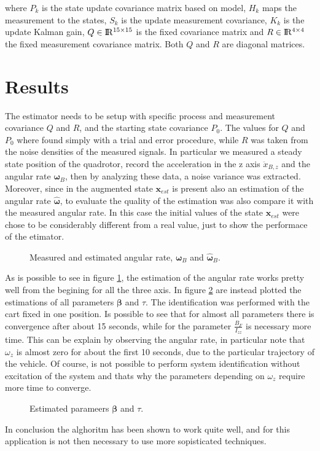 \noindent where $P_k$ is the state update covariance matrix based on model, $H_k$ maps the measurement to the states, $S_k$ is the update measurement covariance, $K_k$ is the update Kalman gain, $Q\in\rm I\!R^{15\times 15}$ is the fixed covariance matrix and $R\in\rm I\!R^{4\times 4}$ the fixed measurement covariance matrix. Both $Q$ and $R$ are diagonal matrices.


\section{Results}
\label{resultsKalman}
The estimator needs to be setup with specific process and measurement covariance $Q$ and $R$, and the starting state covariance $P_0$. The values for $Q$ and $P_0$ where found simply with a trial and error procedure, while $R$ was taken from the noise densities of the measured signals. In particular we measured a steady state position of the quadrotor, record the acceleration in the z axis $\ddot{x}_{B,z}$ and the angular rate $\boldsymbol{\omega}_B$, then by analyzing these data, a noise variance was extracted. Moreover, since in the augmented state $\mathbf{x}_{est}$ is present also an estimation of the angular rate $\hat{\boldsymbol{\omega}}$, to evaluate the quality of the estimation was also compare it with the measured angular rate. In this case the initial values of the state $\mathbf{x}_{est}$ were chose to be considerably different from a real value, just to show the performace of the etimator.

\begin{figure}[h]
	\centering
 	
 	\caption{Measured and estimated angular rate, $\boldsymbol{\omega}_B$ and $\hat{\boldsymbol{\omega}}_B$.}
 	\label{fig:omegaKalman}		
\end{figure}

\noindent As is possible to see in figure \ref{fig:omegaKalman}, the estimation of the angular rate works pretty well from the begining for all the three axis. In figure \ref{fig:betaTauKalman} are instead plotted the estimations of all parameters $\boldsymbol{\beta}$ and $\tau$. The identification was performed with the cart fixed in one position. Is possible to see that for almost all parameters there is convergence after about 15 seconds, while for the parameter $\frac{B_F}{I_{zz}}$ is necessary more time. This can be explain by observing the angular rate, in particular note that $\omega_z$ is almost zero for about the first 10 seconds, due to the particular trajectory of the vehicle. Of course, is not possible to perform system identification without excitation of the system and thats why the parameters depending on $\omega_z$ require more time to converge.

\begin{figure}[h]
	\centering
	
	
	\caption{Estimated parameers $\boldsymbol{\beta}$ and $\tau$.}
	\label{fig:betaTauKalman}
\end{figure}

\noindent In conclusion the alghoritm has been shown to work quite well, and for this application is not then necessary to use more sopisticated techniques.
